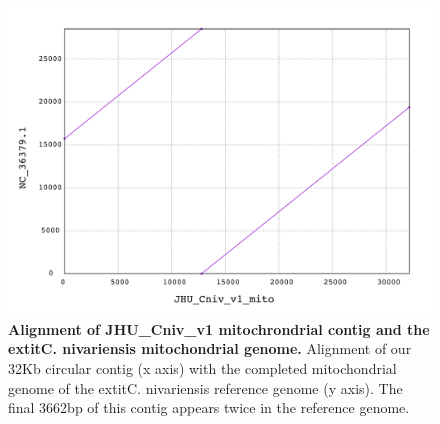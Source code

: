 \begin{figure}[!ht]
\centering
\includegraphics[width = 1\linewidth,keepaspectratio]{figure/mito.pdf}
\caption[Alignment of JHU\_Cniv\_v1 mitochrondrial contig and the 	extit{C. nivariensis} mitochondrial genome]{{\bf Alignment of JHU\_Cniv\_v1 mitochrondrial contig and the 	extit{C. nivariensis} mitochondrial genome.} Alignment of our 32Kb circular contig (x axis) with the completed mitochondrial genome of the 	extit{C. nivariensis} reference genome (y axis). The final 3662bp of this contig appears twice in the reference genome. }
\label{fig:mito}
\end{figure}


